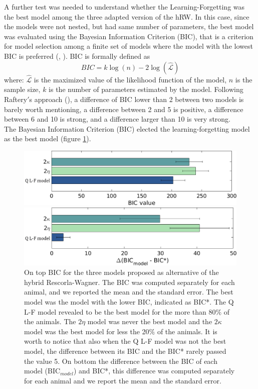 A further test was needed to understand whether the Learning-Forgetting was the best model among the three adapted version of the hRW. In this case, since the models were not nested, but had same number of parameters, the best model was evaluated using the Bayesian Information Criterion (BIC), that is a criterion for model selection among a finite set of models where the model with the lowest BIC is preferred (\cite{Schwarz}, \cite{NeathCavanaugh}). BIC is formally defined as 
\begin{equation*}
    BIC=k\log(n)-2\log(\hat{\mathcal{L}})
\end{equation*}
where: ${\hat{\mathcal{L}}}$ is the maximized value of the likelihood function of the model, $n$ is the sample size, $k$ is the number of parameters estimated by the model. Following Raftery$'$s approach (\cite{Raftery}), a difference of BIC lower than 2 between two models is barely worth mentioning, a difference between 2 and 5 is positive, a difference between 6 and 10 is strong, and a difference larger than 10 is very strong.\\The Bayesian Information Criterion (BIC) elected the learning-forgetting model as the best model (figure \ref{fig:BIC}).
\begin{figure}
    \centering
    \includegraphics[scale=0.45]{figures/BIC_Value.png}
    
    \vspace{1cm}
    
    \includegraphics[scale=0.45]{figures/DeltaBIC.png}
    \caption{On top BIC for the three models proposed as alternative of the hybrid Rescorla-Wagner. The BIC was computed separately for each animal, and we reported the mean and the standard error. The best model was the model with the lower BIC, indicated as BIC*. The Q L-F model revealed to be the best model for the more than 80$\%$ of the animals. The $2\eta$ model was never the best model and the $2\kappa$ model was the best model for less the 20$\%$ of the animals. It is worth to notice that also when the Q L-F model was not the best model, the difference between its BIC and the BIC* rarely passed the value 5. On bottom the difference between the BIC of each model (BIC$_{model}$) and BIC*, this difference was computed separately for each animal and we report the mean and the standard error.}
    \label{fig:BIC}
\end{figure}
